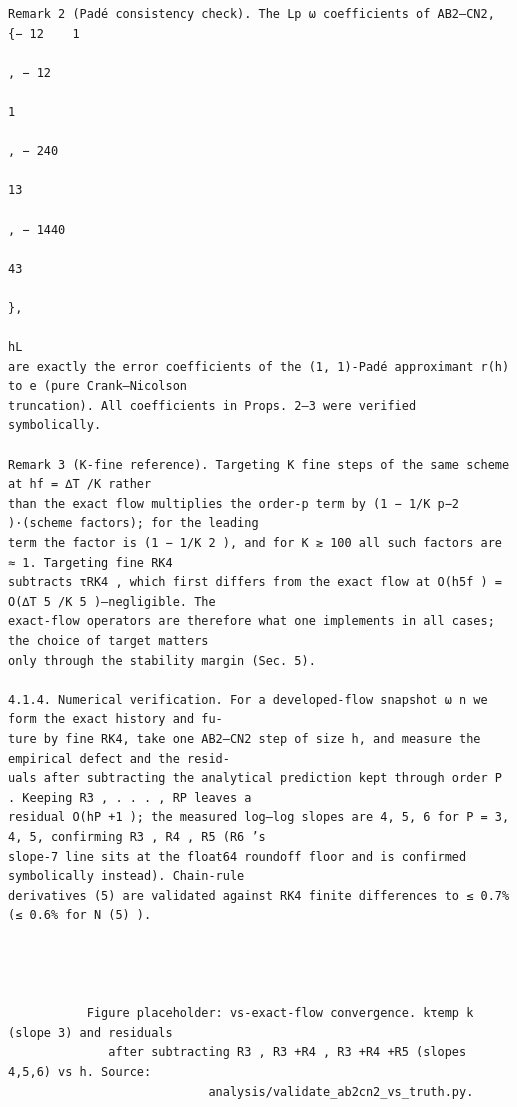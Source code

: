 \documentclass[letterpaper]{article}
\begin{document}
\begin{Verbatim}[fontsize=\fontsize{6.35}{7.15}\selectfont,breaklines=false]
Remark 2 (Padé consistency check). The Lp ω coefficients of AB2–CN2, {− 12    1
                                                                              , − 12
                                                                                   1
                                                                                     , − 240
                                                                                          13
                                                                                             , − 1440
                                                                                                  43
                                                                                                      },
                                                                         hL
are exactly the error coefficients of the (1, 1)-Padé approximant r(h) to e (pure Crank–Nicolson
truncation). All coefficients in Props. 2–3 were verified symbolically.

Remark 3 (K-fine reference). Targeting K fine steps of the same scheme at hf = ∆T /K rather
than the exact flow multiplies the order-p term by (1 − 1/K p−2 )·(scheme factors); for the leading
term the factor is (1 − 1/K 2 ), and for K ≳ 100 all such factors are ≈ 1. Targeting fine RK4
subtracts τRK4 , which first differs from the exact flow at O(h5f ) = O(∆T 5 /K 5 )—negligible. The
exact-flow operators are therefore what one implements in all cases; the choice of target matters
only through the stability margin (Sec. 5).

4.1.4. Numerical verification. For a developed-flow snapshot ω n we form the exact history and fu-
ture by fine RK4, take one AB2–CN2 step of size h, and measure the empirical defect and the resid-
uals after subtracting the analytical prediction kept through order P . Keeping R3 , . . . , RP leaves a
residual O(hP +1 ); the measured log–log slopes are 4, 5, 6 for P = 3, 4, 5, confirming R3 , R4 , R5 (R6 ’s
slope-7 line sits at the float64 roundoff floor and is confirmed symbolically instead). Chain-rule
derivatives (5) are validated against RK4 finite differences to ≤ 0.7% (≤ 0.6% for N (5) ).




           Figure placeholder: vs-exact-flow convergence. kτemp k (slope 3) and residuals
              after subtracting R3 , R3 +R4 , R3 +R4 +R5 (slopes 4,5,6) vs h. Source:
                            analysis/validate_ab2cn2_vs_truth.py.





\end{Verbatim}
\end{document}
